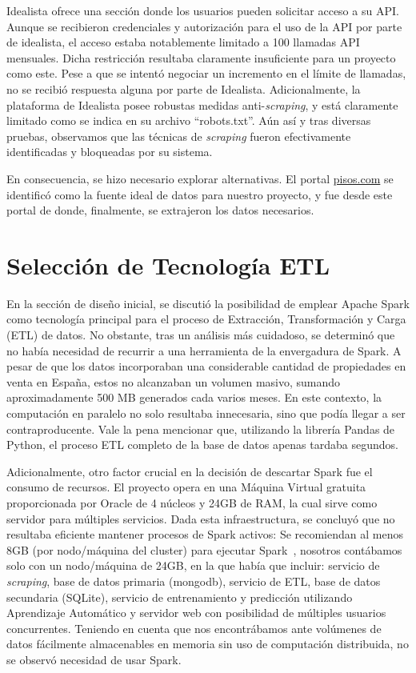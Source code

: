 Idealista ofrece una sección donde los usuarios pueden solicitar acceso a su API. Aunque se recibieron credenciales y autorización para el uso de la API por parte de idealista, el acceso estaba notablemente limitado a 100 llamadas API mensuales. Dicha restricción resultaba claramente insuficiente para un proyecto como este. Pese a que se intentó negociar un incremento en el límite de llamadas, no se recibió respuesta alguna por parte de Idealista. Adicionalmente, la plataforma de Idealista posee robustas medidas anti-\textit{scraping}, y está claramente limitado como se indica en su archivo ``robots.txt''. Aún así y tras diversas pruebas, observamos que las técnicas de \textit{scraping} fueron efectivamente identificadas y bloqueadas por su sistema.

En consecuencia, se hizo necesario explorar alternativas. El portal \url{pisos.com} se identificó como la fuente ideal de datos para nuestro proyecto, y fue desde este portal de donde, finalmente, se extrajeron los datos necesarios.

\clearpage
\section{Selección de Tecnología ETL}\label{sec:seleccion_tec_etl}

En la sección de diseño inicial, se discutió la posibilidad de emplear Apache Spark como tecnología principal para el proceso de Extracción, Transformación y Carga (ETL) de datos. No obstante, tras un análisis más cuidadoso, se determinó que no había necesidad de recurrir a una herramienta de la envergadura de Spark. A pesar de que los datos incorporaban una considerable cantidad de propiedades en venta en España, estos no alcanzaban un volumen masivo, sumando aproximadamente 500 MB generados cada varios meses. En este contexto, la computación en paralelo no solo resultaba innecesaria, sino que podía llegar a ser contraproducente. Vale la pena mencionar que, utilizando la librería Pandas de Python, el proceso ETL completo de la base de datos apenas tardaba segundos.

Adicionalmente, otro factor crucial en la decisión de descartar Spark fue el consumo de recursos. El proyecto opera en una Máquina Virtual gratuita proporcionada por Oracle de 4 núcleos y 24GB de RAM, la cual sirve como servidor para múltiples servicios. Dada esta infraestructura, se concluyó que no resultaba eficiente mantener procesos de Spark activos: Se recomiendan al menos 8GB (por nodo/máquina del cluster) para ejecutar Spark~\cite{spark_resources}, nosotros contábamos solo con un nodo/máquina de 24GB, en la que había que incluir: servicio de \textit{scraping}, base de datos primaria (mongodb), servicio de ETL, base de datos secundaria (SQLite), servicio de entrenamiento y predicción utilizando Aprendizaje Automático y servidor web con posibilidad de múltiples usuarios concurrentes. Teniendo en cuenta que nos encontrábamos ante volúmenes de datos fácilmente almacenables en memoria sin uso de computación distribuida, no se observó necesidad de usar Spark.

